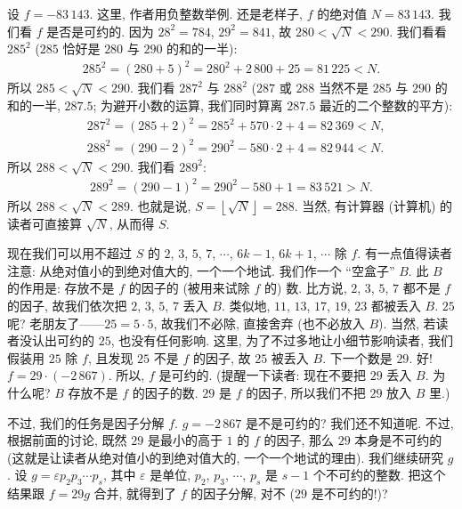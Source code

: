 \begin{example}
    设 $f = -83\,143$. 这里, 作者用负整数举例. 还是老样子, $f$ 的绝对值 $N = 83\,143$. 我们看 $f$ 是否是可约的. 因为 $28^2 = 784$, $29^2 = 841$, 故 $280 < \sqrt{N} < 290$. 我们看看 $285^2$ ($285$ 恰好是 $280$ 与 $290$ 的和的一半):
    \begin{align*}
        285^2 = (280 + 5)^2 = 280^2 + 2\,800 + 25 = 81\,225 < N.
    \end{align*}
    所以 $285 < \sqrt{N} < 290$. 我们看 $287^2$ 与 $288^2$ ($287$ 或 $288$ 当然不是 $285$ 与 $290$ 的和的一半, $287.5$; 为避开小数的运算, 我们同时算离 $287.5$ 最近的二个整数的平方):
    \begin{align*}
         & 287^2 = (285 + 2)^2 = 285^2 + 570 \cdot 2 + 4 = 82\,369 < N, \\
         & 288^2 = (290 - 2)^2 = 290^2 - 580 \cdot 2 + 4 = 82\,944 < N.
    \end{align*}
    所以 $288 < \sqrt{N} < 290$. 我们看 $289^2$:
    \begin{align*}
        289^2 = (290 - 1)^2 = 290^2 - 580 + 1 = 83\,521 > N.
    \end{align*}
    所以 $288 < \sqrt{N} < 289$. 也就是说, $S = \left \lfloor \sqrt{N} \right \rfloor = 288$. 当然, 有计算器 (计算机) 的读者可直接算 $\sqrt{N}$, 从而得 $S$.

    现在我们可以用不超过 $S$ 的 $2$, $3$, $5$, $7$, $\cdots$, $6k-1$, $6k+1$, $\cdots$ 除 $f$. 有一点值得读者注意: 从绝对值小的到绝对值大的, 一个一个地试. 我们作一个 ``空盒子'' $B$. 此 $B$ 的作用是: 存放不是 $f$ 的因子的 (被用来试除 $f$ 的) 数. 比方说, $2$, $3$, $5$, $7$ 都不是 $f$ 的因子, 故我们依次把 $2$, $3$, $5$, $7$ 丢入 $B$. 类似地, $11$, $13$, $17$, $19$, $23$ 都被丢入 $B$. $25$ 呢? 老朋友了——$25 = 5 \cdot 5$, 故我们不必除, 直接舍弃 (也不必放入 $B$). 当然, 若读者没认出可约的 $25$, 也没有任何影响. 这里, 为了不过多地让小细节影响读者, 我们假装用 $25$ 除 $f$, 且发现 $25$ 不是 $f$ 的因子, 故 $25$ 被丢入 $B$. 下一个数是 $29$. 好! $f = 29 \cdot (-2\,867)$. 所以, $f$ 是可约的. (提醒一下读者: 现在不要把 $29$ 丢入 $B$. 为什么呢? $B$ 存放不是 $f$ 的因子的数. $29$ 是 $f$ 的因子, 所以我们不把 $29$ 放入 $B$ 里.)

    不过, 我们的任务是因子分解 $f$. $g = -2\,867$ 是不是可约的? 我们还不知道呢. 不过, 根据前面的讨论, 既然 $29$ 是最小的高于 $1$ 的 $f$ 的因子, 那么 $29$ 本身是不可约的 (这就是让读者从绝对值小的到绝对值大的, 一个一个地试的理由). 我们继续研究 $g$. 设 $g = \varepsilon p_2 p_3 \cdots p_s$, 其中 $\varepsilon$ 是单位, $p_2$, $p_3$, $\cdots$, $p_s$ 是 $s-1$ 个不可约的整数. 把这个结果跟 $f = 29g$ 合并, 就得到了 $f$ 的因子分解, 对不 ($29$ 是不可约的!)?


\end{example}
